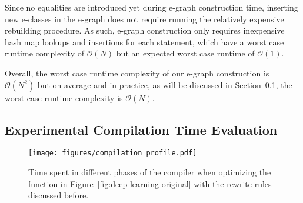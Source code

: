 Since no equalities are introduced yet during e-graph construction time, inserting new e-classes in the e-graph does not require running the relatively expensive rebuilding procedure.
As such, e-graph construction only requires inexpensive hash map lookups and insertions for each statement, which have a worst case runtime complexity of $\mathcal{O}(N)$ but an expected worst case runtime of $\mathcal{O}(1)$.

Overall, the worst case runtime complexity of our e-graph construction is $\mathcal{O}(N^2)$ but on average and in practice, as will be discussed in Section~\ref{sec:experimental compile time}, the worst case runtime complexity is $\mathcal{O}(N)$.



\subsection{Experimental Compilation Time Evaluation}
\label{sec:experimental compile time}
\begin{figure}
    \centering
    \texttt{[image: figures/compilation\_profile.pdf]}
    \caption{Time spent in different phases of the compiler when optimizing the  function in Figure~\ref{fig:deep learning original} with the rewrite rules discussed before.}
    \label{fig:compilation profile}
\end{figure}

